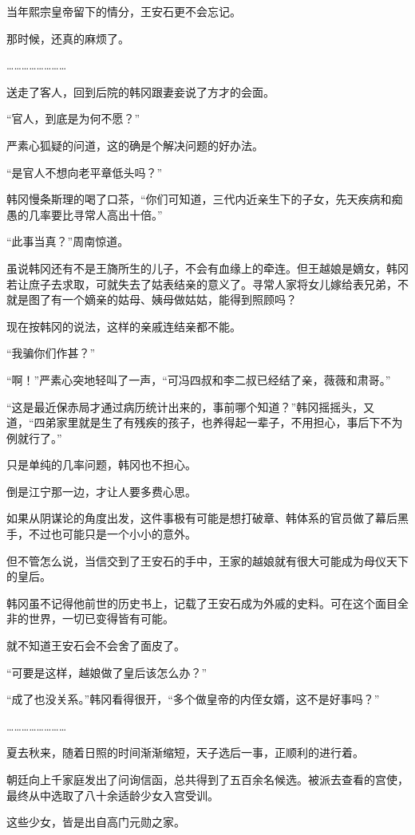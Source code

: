 当年熙宗皇帝留下的情分，王安石更不会忘记。

那时候，还真的麻烦了。

……………………

送走了客人，回到后院的韩冈跟妻妾说了方才的会面。

“官人，到底是为何不愿？”

严素心狐疑的问道，这的确是个解决问题的好办法。

“是官人不想向老平章低头吗？”

韩冈慢条斯理的喝了口茶，“你们可知道，三代内近亲生下的子女，先天疾病和痴愚的几率要比寻常人高出十倍。”

“此事当真？”周南惊道。

虽说韩冈还有不是王旖所生的儿子，不会有血缘上的牵连。但王越娘是嫡女，韩冈若让庶子去求取，可就失去了姑表结亲的意义了。寻常人家将女儿嫁给表兄弟，不就是图了有一个嫡亲的姑母、姨母做姑姑，能得到照顾吗？

现在按韩冈的说法，这样的亲戚连结亲都不能。

“我骗你们作甚？”

“啊！”严素心突地轻叫了一声，“可冯四叔和李二叔已经结了亲，薇薇和肃哥。”

“这是最近保赤局才通过病历统计出来的，事前哪个知道？”韩冈摇摇头，又道，“四弟家里就是生了有残疾的孩子，也养得起一辈子，不用担心，事后下不为例就行了。”

只是单纯的几率问题，韩冈也不担心。

倒是江宁那一边，才让人要多费心思。

如果从阴谋论的角度出发，这件事极有可能是想打破章、韩体系的官员做了幕后黑手，不过也可能只是一个小小的意外。

但不管怎么说，当信交到了王安石的手中，王家的越娘就有很大可能成为母仪天下的皇后。

韩冈虽不记得他前世的历史书上，记载了王安石成为外戚的史料。可在这个面目全非的世界，一切已变得皆有可能。

就不知道王安石会不会舍了面皮了。

“可要是这样，越娘做了皇后该怎么办？”

“成了也没关系。”韩冈看得很开，“多个做皇帝的内侄女婿，这不是好事吗？”

……………………

夏去秋来，随着日照的时间渐渐缩短，天子选后一事，正顺利的进行着。

朝廷向上千家庭发出了问询信函，总共得到了五百余名候选。被派去查看的宫使，最终从中选取了八十余适龄少女入宫受训。

这些少女，皆是出自高门元勋之家。

